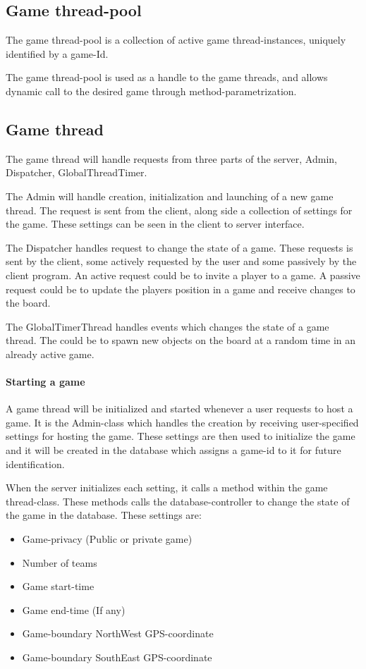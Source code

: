 \subsection{Game thread-pool}
The game thread-pool is a collection of active game thread-instances, uniquely identified by a game-Id.

The game thread-pool is used as a handle to the game threads, and allows dynamic call to the desired game through method-parametrization. 

\subsection{Game thread}\label{designgamethread}
The game thread will handle requests from three parts of the server, Admin, Dispatcher, GlobalThreadTimer.

The Admin will handle creation, initialization and launching of a new game thread. The request is sent from the client, along side a collection of settings for the game. These settings  can be seen in the client to server interface. 

The Dispatcher handles request to change the state of a game. These requests is sent by the client, some actively requested by the user and some passively by the client program. An active request could be to invite a player to a game. A passive request could be to update the players position in a game and receive changes to the board.

The GlobalTimerThread handles events which changes the state of a game thread. The could be to spawn new objects on the board at a random time in an already active game. 


\paragraph{Starting a game}
A game thread will be initialized and started whenever a user requests to host a game. It is the Admin-class which handles the creation by receiving user-specified settings for hosting the game. These settings are then used to initialize the game and it will be created in the database which assigns a game-id to it for future identification.

When the server initializes each setting, it calls a method within the game thread-class. These methods calls the database-controller to change the state of the game in the database. These settings are:
\begin{itemize}
\item Game-privacy (Public or private game)
\item Number of teams
\item Game start-time
\item Game end-time (If any)
\item Game-boundary NorthWest GPS-coordinate
\item Game-boundary SouthEast GPS-coordinate
\end{itemize}

